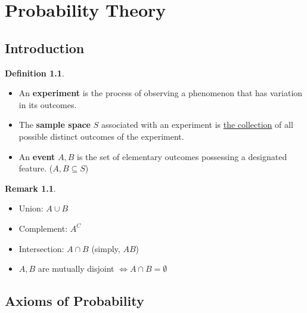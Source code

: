 \documentclass[12pt,openany]{book}
\theoremstyle{definition}
\newtheorem{definition}{Definition}[chapter]
\newtheorem{remark}{Remark}[chapter]
\begin{document}
	\newpage
	\chapter{Probability Theory}
	
	\section{Introduction}
	
	\begin{tcolorbox}[colback=white,colframe=defcolor,arc=5pt,title={\color{white}\bf }]
		\begin{definition}
			\ \begin{itemize}
				\item An \textbf{experiment} is the process of observing a phenomenon that has variation in its outcomes.
				\item The \textbf{sample space} $S$ associated with an experiment is \underline{the collection} of all
				possible distinct outcomes of the experiment.
				\item An \textbf{event} $A, B$ is the set of elementary outcomes possessing a designated feature. ($A,B\subseteq S$)
			\end{itemize}
		\end{definition}
	\end{tcolorbox}
	\begin{remark}
		\ \begin{itemize}
			\item Union: $A\cup B$
			\item Complement: $A^C$
			\item Intersection: $A\cap B$ (simply, $AB$)
			\item $A,B$ are mutually disjoint $\iff A\cap B=\emptyset$
		\end{itemize}
	\end{remark}
	
	\newpage
	\section{Axioms of Probability}
\end{document}
